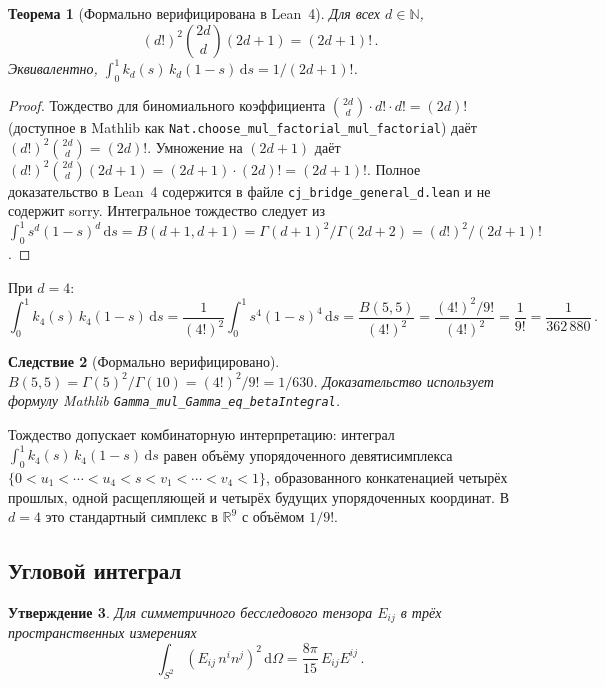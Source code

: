 \documentclass[12pt,a4paper]{article}
\theoremstyle{plain}
\newtheorem{theorem}{Теорема}[section]
\newtheorem{proposition}[theorem]{Утверждение}
\newtheorem{corollary}[theorem]{Следствие}
\theoremstyle{definition}
\theoremstyle{remark}
\newcommand{\dd}{\mathrm{d}}
\newcommand{\Esq}{E_{ij}E^{ij}}
\begin{document}
\begin{theorem}[Формально верифицирована в Lean~4]
\label{thm:beta}
Для всех $d \in \mathbb{N}$,
\begin{equation}\label{eq:beta-general}
  (d!)^2 \binom{2d}{d} (2d+1) = (2d+1)!\,.
\end{equation}
Эквивалентно,
$\int_0^1 k_d(s)\, k_d(1-s)\,\dd s = 1/(2d+1)!$.
\end{theorem}

\begin{proof}
Тождество для биномиального коэффициента
$\binom{2d}{d} \cdot d! \cdot d! = (2d)!$ (доступное в
Mathlib как
\texttt{Nat.choose\_mul\_factorial\_mul\_factorial}) даёт
$(d!)^2 \binom{2d}{d} = (2d)!$.  Умножение на $(2d+1)$
даёт
$(d!)^2 \binom{2d}{d} (2d+1) = (2d+1) \cdot (2d)! = (2d+1)!$.
Полное доказательство в Lean~4 содержится в файле
\texttt{cj\_bridge\_general\_d.lean} и не содержит sorry.
Интегральное тождество следует из
$\int_0^1 s^d (1-s)^d\,\dd s = B(d+1, d+1) =
\Gamma(d+1)^2 / \Gamma(2d+2) = (d!)^2 / (2d+1)!$.
\end{proof}

При $d = 4$:
\begin{equation}\label{eq:beta-d4}
  \int_0^1 k_4(s)\, k_4(1-s)\,\dd s
  = \frac{1}{(4!)^2} \int_0^1 s^4(1-s)^4\,\dd s
  = \frac{B(5,5)}{(4!)^2}
  = \frac{(4!)^2/9!}{(4!)^2}
  = \frac{1}{9!}
  = \frac{1}{362\,880}\,.
\end{equation}

\begin{corollary}[Формально верифицировано]
\label{cor:beta55}
$B(5,5) = \Gamma(5)^2 / \Gamma(10) = (4!)^2 / 9! = 1/630$.
Доказательство использует формулу Mathlib
\texttt{Gamma\_mul\_Gamma\_eq\_betaIntegral}.
\end{corollary}

Тождество допускает комбинаторную интерпретацию: интеграл
$\int_0^1 k_4(s)\,k_4(1-s)\,\dd s$ равен объёму
упорядоченного девятисимплекса
$\{0 < u_1 < \cdots < u_4 < s < v_1 < \cdots < v_4 < 1\}$,
образованного конкатенацией четырёх прошлых, одной
расщепляющей и четырёх будущих упорядоченных координат.
В $d = 4$ это стандартный симплекс в $\mathbb{R}^9$ с
объёмом $1/9!$.

\subsection{Угловой интеграл}
\label{sec:angular}

\begin{proposition}
\label{prop:angular}
Для симметричного бесследового тензора $E_{ij}$ в трёх
пространственных измерениях
\begin{equation}\label{eq:angular}
  \int_{S^2} (E_{ij}\, n^i n^j)^2\, \dd\Omega
  = \frac{8\pi}{15}\, \Esq\,.
\end{equation}
\end{proposition}
\end{document}
